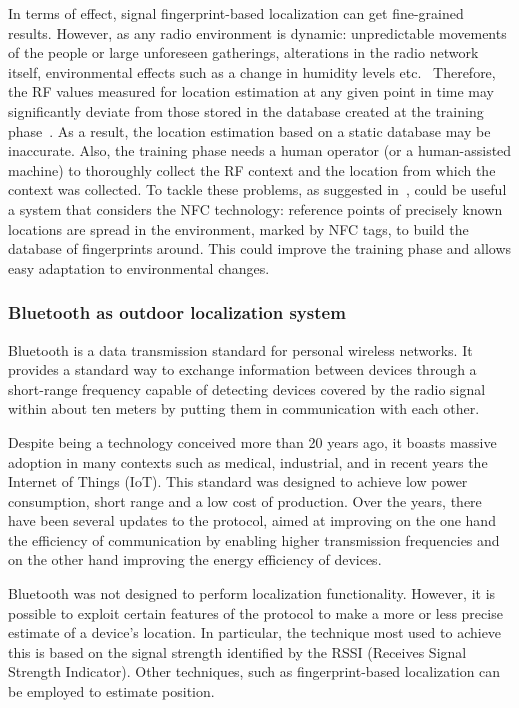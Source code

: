 In terms of effect, signal fingerprint-based localization can get fine-grained results. However, as any radio environment is dynamic: unpredictable
movements of the people or large unforeseen gatherings, alterations in the radio network itself, environmental effects such as a change in humidity
levels etc.~\cite{chaudhry2013indoor} Therefore, the RF values measured for location estimation at any given point in time may significantly deviate
from those stored in the database created at the training phase~\cite{chaudhry2013indoor}. As a result, the location estimation based on a static
database may be inaccurate. Also, the training phase needs a human operator (or a human-assisted machine) to thoroughly collect the RF context and
the location from which the context was collected. To tackle these problems, as suggested in~\cite{chaudhry2013indoor}, could be useful a system that
considers the NFC technology: reference points of precisely known locations are spread in the environment, marked by NFC tags, to build the database
of fingerprints around. This could improve the training phase and allows easy adaptation to environmental changes.

\subsubsection{Bluetooth as outdoor localization system}
Bluetooth is a data transmission standard for personal wireless networks. It provides a standard way to exchange information between devices through
a short-range frequency capable of detecting devices covered by the radio signal within about ten meters by putting them in communication with each
other.

Despite being a technology conceived more than 20 years ago, it boasts massive adoption in many contexts such as medical, industrial, and in recent
years the Internet of Things (IoT). This standard was designed to achieve low power consumption, short range and a low cost of production. Over the
years, there have been several updates to the protocol, aimed at improving on the one hand the efficiency of communication by enabling higher
transmission frequencies and on the other hand improving the energy efficiency of devices.

Bluetooth was not designed to perform localization functionality. However, it is possible to exploit certain features of the protocol to make a more
or less precise estimate of a device's location. In particular, the technique most used to achieve this is based on the signal strength identified by
the RSSI (Receives Signal Strength Indicator). Other techniques, such as fingerprint-based localization can be employed to estimate position.

